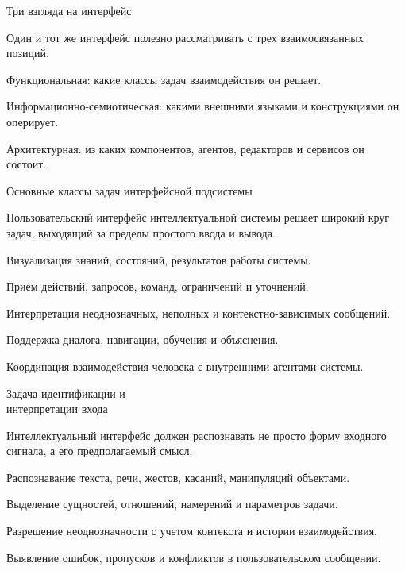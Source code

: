 \begin{frame}{Три взгляда на интерфейс}
	\topline
	\justifying

	
	Один и тот же интерфейс полезно рассматривать с трех взаимосвязанных позиций.
	
	\begin{textitemize}
		\item Функциональная: какие классы задач взаимодействия он решает.
		\item Информационно-семиотическая: какими внешними языками и конструкциями он оперирует.
		\item Архитектурная: из каких компонентов, агентов, редакторов и сервисов он состоит.
	\end{textitemize}
\end{frame}

\begin{frame}{Основные классы задач интерфейсной подсистемы}
	\topline
	\justifying

	Пользовательский интерфейс интеллектуальной системы решает широкий круг задач, выходящий за пределы простого ввода и вывода.
	
	\begin{textitemize}
		\item Визуализация знаний, состояний, результатов работы системы.
		\item Прием действий, запросов, команд, ограничений и уточнений.
		\item Интерпретация неоднозначных, неполных и контекстно-зависимых сообщений.
		\item Поддержка диалога, навигации, обучения и объяснения.
		\item Координация взаимодействия человека с внутренними агентами системы.
	\end{textitemize}
\end{frame}

\begin{frame}{Задача идентификации и\\ интерпретации входа}
	\topline
	\justifying

	Интеллектуальный интерфейс должен распознавать не просто форму входного сигнала, а его предполагаемый смысл.
	
	\begin{textitemize}
		\item Распознавание текста, речи, жестов, касаний, манипуляций объектами.
		\item Выделение сущностей, отношений, намерений и параметров задачи.
		\item Разрешение неоднозначности с учетом контекста и истории взаимодействия.
		\item Выявление ошибок, пропусков и конфликтов в пользовательском сообщении.
	\end{textitemize}
\end{frame}

